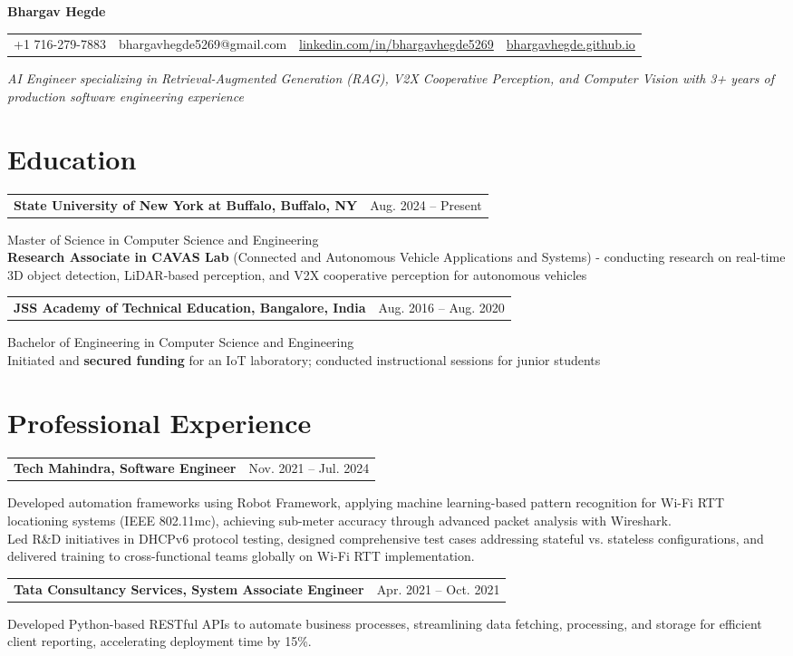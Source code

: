 \documentclass[10pt, a4paper]{article}
\makeatletter
\newcommand{\name}[1]{\begin{center}\Huge\bfseries #1\end{center}\vspace{-3pt}}
\newcommand{\contact}[4]{
\begin{center}
\scriptsize
\begin{tabular}{c@{\hspace{0.6em}}c@{\hspace{0.6em}}c@{\hspace{0.6em}}c}
#1 & #2 & \href{#3}{linkedin.com/in/bhargavhegde5269} & \href{#4}{bhargavhegde.github.io}
\end{tabular}
\end{center}\vspace{0pt}
}
\newcommand{\titlejob}[1]{\begin{center}\small\itshape #1\end{center}\vspace{-2pt}}
\newenvironment{entry}[2]{
  \noindent\begin{tabularx}{\linewidth}{@{}X@{\hspace{1.5em}}r@{}}
    \textbf{#1} & #2 \\
  \end{tabularx}
  \vspace{1pt}
  \noindent\small
}{\vspace{2pt}}
\makeatother
\begin{document}
\name{Bhargav Hegde}
\contact{+1 716-279-7883}{bhargavhegde5269@gmail.com}{https://www.linkedin.com/in/bhargavhegde5269}{https://bhargavhegde.github.io/}
\titlejob{AI Engineer specializing in Retrieval-Augmented Generation (RAG), V2X Cooperative Perception, and Computer Vision with 3+ years of production software engineering experience}

\section{Education}
\begin{entry}{State University of New York at Buffalo, Buffalo, NY}{Aug. 2024 – Present}
  Master of Science in Computer Science and Engineering \\
  \textbf{Research Associate in CAVAS Lab} (Connected and Autonomous Vehicle Applications and Systems) - conducting research on real-time 3D object detection, LiDAR-based perception, and V2X cooperative perception for autonomous vehicles
\end{entry}

\begin{entry}{JSS Academy of Technical Education, Bangalore, India}{Aug. 2016 – Aug. 2020}
  Bachelor of Engineering in Computer Science and Engineering \\
  Initiated and \textbf{secured funding} for an IoT laboratory; conducted instructional sessions for junior students
\end{entry}

\section{Professional Experience}
\begin{entry}{Tech Mahindra, Software Engineer}{Nov. 2021 – Jul. 2024}
  Developed automation frameworks using Robot Framework, applying machine learning-based pattern recognition for Wi-Fi RTT locationing systems (IEEE 802.11mc), achieving sub-meter accuracy through advanced packet analysis with Wireshark. \\
  Led R\&D initiatives in DHCPv6 protocol testing, designed comprehensive test cases addressing stateful vs. stateless configurations, and delivered training to cross-functional teams globally on Wi-Fi RTT implementation.
\end{entry}

\begin{entry}{Tata Consultancy Services, System Associate Engineer}{Apr. 2021 – Oct. 2021}
  Developed Python-based RESTful APIs to automate business processes, streamlining data fetching, processing, and storage for efficient client reporting, accelerating deployment time by 15\%.
\end{entry}
\end{document}
